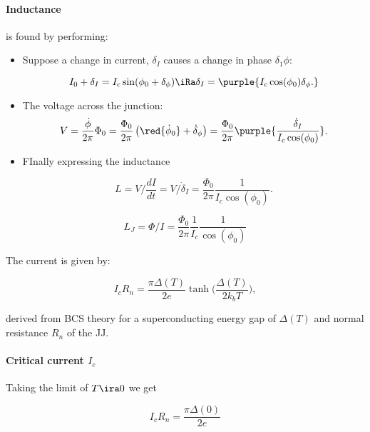 \paragraph{Inductance} is found by performing:

\begin{itemize}
\item Suppose  a change  in current,  $ \delta_I $  causes a  change in
  phase $ \delta_1\phi $:

    \begin{equation}\label{key}
      I_0 + \delta_I = I_c\sin(\phi_0+\delta_\phi) \iRa \delta_I = \purple{I_c\cos(\phi_0)\delta_\phi.}
    \end{equation}
  \item The voltage across the junction:
    \begin{equation}\label{key}
      V = \frac{\dot{\phi}}{2\pi}\Phi_0 = \frac{\Phi_0}{2\pi}\left(\red{\dot{\phi}_0} + \dot{\delta}_\phi\right) =  \frac{\Phi_0}{2\pi}\purple{\frac{\dot{\delta}_I}{I_c\cos(\phi_0)}}.
    \end{equation}

  \item FInally expressing the inductance

    \begin{equation}\label{key}
      L = V/\frac{dI}{dt} = V/\dot{\delta}_I = \frac{\Phi_0}{2\pi}\frac{1}{I_c\cos(\phi_0)}.
    \end{equation}
  \end{itemize}

  \begin{framed}\noindent
    \begin{equation}\label{key} L_J = \Phi/I =
      \frac{\Phi_0}{2\pi}\frac{1}{I_c}\frac{1}{\cos(\phi_0)}
    \end{equation}
  \end{framed}

  \noindent The current is given by:

   \begin{equation}\label{key}
     I_cR_n = \frac{\pi\Delta(T)}{2e}\tanh\big(\frac{\Delta(T)}{2k_bT}\big),
   \end{equation}

   \noindent derived from  BCS theory for a  superconducting energy gap
   of $ \Delta(T) $ and normal resistance $ R_n $ of the JJ.

   {
     \paragraph{Critical current $ I_c $}
     Taking the limit of $ T\ira0 $ we get

    \begin{equation}\label{app:criticalCurrent}
      I_cR_n = \frac{\pi\Delta(0)}{2e}
    \end{equation}
  }


